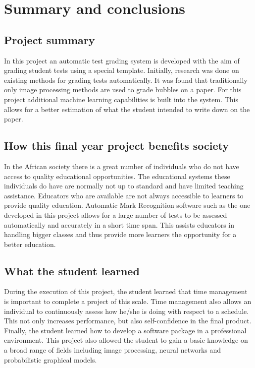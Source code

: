 \def\baselinestretch{1}
\chapter{Summary and conclusions}
\label{ch:Conclusions}

\graphicspath{{Conclusions/Figures_Conclusions/}}
\section{Project summary}
In this project an automatic test grading system is developed with the aim of grading student tests using a special template. Initially, research was done on existing methods for grading tests automatically. It was found that traditionally only image processing methods are used to grade bubbles on a paper. For this project additional machine learning capabilities is built into the system. This allows for a better estimation of what the student  intended to write down on the paper.

\section{How this final year project benefits society}
In the African society there is a great number of individuals who do not have access to quality educational opportunities. The educational systems these individuals do have are normally not up to standard and have limited teaching assistance. Educators who are available are not always accessible to learners to provide quality education. Automatic Mark Recognition software such as the one developed in this project allows for a large number of tests to be assessed automatically and accurately in a short time span. This assists educators in handling bigger classes and thus provide more learners the opportunity for a better education.

\section{What the student learned}
During the execution of this project, the student learned that time management is important to complete a project of this scale. Time management also allows an individual to continuously assess how he/she is doing with respect to a schedule. This not only increases performance, but also self-confidence in the final product. Finally, the student learned how to develop a software package in a professional environment. This project also allowed the student to gain a basic knowledge on a broad range of fields including image processing, neural networks and probabilistic graphical models.

